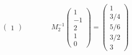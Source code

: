 \documentclass[twoside]{article}
\begin{document}
\begin{solucion}
\begin{gather*}
\begin{pmatrix}
1
\end{pmatrix} \qquad \qquad M_2^{-1}  \begin{pmatrix}
1\\
-1\\
2\\
1\\
0
\end{pmatrix} = 
 \begin{pmatrix}
1\\
3/4\\
5/6\\
3/2\\
3
\end{pmatrix} 
\end{gather*}
\end{solucion}
\end{document}
